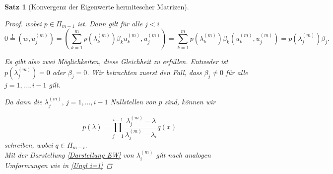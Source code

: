\documentclass{article}
\theoremstyle{plain}
\newtheorem{theorem}    {Satz}   [section]
\begin{document}
\begin{theorem}[Konvergenz der Eigenwerte hermitescher Matrizen]
\begin{proof}
	wobei $p \in \Pi_{m-1}$ ist.
	Dann gilt für alle $j < i$
	\begin{equation*}
		0 \stackrel{!}{=} (w,u_j^{(m)}) = (\sum_{k=1}^{m} p(\lambda_k^{(m)}) \beta_k u_k^{(m)},u_j^{(m)}) = \sum_{k=1}^{m} p(\lambda_k^{(m)}) \beta_k (u_k^{(m)},u_j^{(m)}) = p(\lambda_j^{(m)}) \beta_j.
	\end{equation*}

	Es gibt also zwei Möglichkeiten, diese Gleichheit zu erfüllen. Entweder ist $p(\lambda_j^{(m)}) = 0$ oder $\beta_j = 0$. Wir betrachten zuerst den Fall, dass  $\beta_j \neq 0$ für alle $j = 1,\dots, i-1$ gilt.

	Da dann die $\lambda_j^{(m)}, \, j = 1,\dots,i-1$ Nullstellen von $p$ sind, können wir

	\begin{equation*}
		p(\lambda) = \prod_{j = 1}^{i-1} \frac{\lambda_j^{(m)} -\lambda}{\lambda_j^{(m)} - \lambda_i} q(x)
	\end{equation*}
	schreiben, wobei $q \in \Pi_{m-i}$.\\

	Mit der Darstellung \eqref{Darstellung EW} von $\lambda_i^{(m)}$ gilt nach analogen Umformungen wie in \eqref{Ungl i=1}


\end{proof}
\end{theorem}
\end{document}
